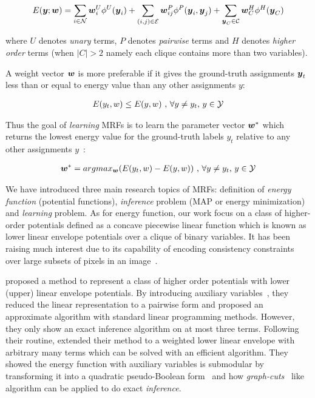 \documentclass[twoside,doublespace,onecolumn,11pt,a4paper]{book}
\renewcommand{\citename}{\citet}
\renewcommand{\cite}{\citep}
\begin{document}
\begin{align}
  \label{eq:energyfunction_UPH}
  E({\boldsymbol{y}};{\boldsymbol{w}})=\sum_{i\in {\cal N}}{{\boldsymbol{w}}_i^U\phi^U({\boldsymbol{y}}_i)}+
  \sum_{(i,j)\in {\cal E}}{{\boldsymbol{w}}_{ij}^P\phi^P({\boldsymbol{y}}_i,{\boldsymbol{y}}_j)}+
  \sum_{{\boldsymbol{y}}_C\in {\cal C}}{{\boldsymbol{w}}_C^H\phi^H({\boldsymbol{y}}_C)}
\end{align}

\noindent where $U$ denotes \emph{unary} terms, $P$ denotes
\emph{pairwise} terms and $H$ denotes \emph{higher order} terms
(when $|C|>2$ namely each clique contains more than two
variables).

A weight vector ${\boldsymbol{w}}$ is more preferable if it gives the
ground-truth assignments ${\boldsymbol{y}}_t$ less than or equal to energy
value than any other assignments $y$:

\begin{align}
E(y_t,w)\leq E(y,w)~ \text{,~}\forall y \neq y_t
\text{,~} y\in {\cal Y}
\end{align}


Thus the goal of \emph{learning} MRFs is to learn the parameter
vector ${\boldsymbol{w}}^*$ which returns the lowest energy value for the
ground-truth labels $y_t$ relative to any other assignments
$y$~\cite{Szummer:ECCV08}:

\begin{align}
{\boldsymbol{w}}^* = argmax_{{\boldsymbol{w}}}(E(y_t,w)-E(y,w))~ \text{,~}\forall y \neq y_t
\text{,~} y\in {\cal Y}
\end{align}

We have introduced three main research topics of MRFs:
definition of \emph{energy function} (potential functions),
\emph{inference} problem (MAP or energy minimization) and
\emph{learning} problem. As for energy function, our work focus
on a class of higher-order potentials defined as a concave
piecewise linear function which is known as lower linear envelope
potentials over a clique of binary variables. It has been raising
much interest due to its capability of encoding consistency
constraints over large subsets of pixels in an
image~\cite{Kohli:CVPR07,Nowozin:2011}.

\citename{kohli2009robust} proposed a method to represent a class
of higher order potentials with lower (upper) linear envelope
potentials. By introducing auxiliary
variables~\cite{Kohli:CVPR10}, they reduced the linear
representation to a pairwise form and proposed an approximate
algorithm with standard linear programming methods. However, they
only show an exact inference algorithm on at most three terms.
Following their routine, \citename{gouldlearning} extended their
method to a weighted lower linear envelope with arbitrary many
terms which can be solved with an efficient algorithm. They
showed the energy function with auxiliary variables is submodular
by transforming it into a quadratic pseudo-Boolean
form~\cite{Boros:MATH02} and how
\emph{graph-cuts}~\cite{Hammer:1965, Boykov:ICCV01, Freedman:CVPR05} like
algorithm can be applied to do exact \emph{inference}.
\end{document}
